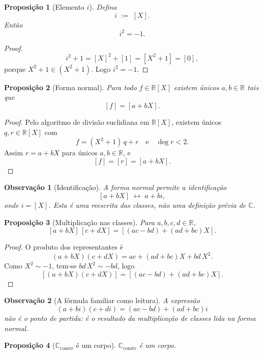 \documentclass[11pt,a4paper]{article}
\newtheorem{proposicao}{Proposição}
\newtheorem{observacao}{Observação}
\begin{document}
\begin{proposicao}[Elemento \(i\)]
\label{prop:i}
Defina
\[
i
\;:=\;
[X].
\]
Então
\[
i^2
=
-1.
\]
\end{proposicao}

\begin{proof}
\[
i^2+1
=
[X]^2+[1]
=
[X^2+1]
=
[0],
\]
porque \(X^2+1\in(X^2+1)\). Logo \(i^2=-1\).
\end{proof}

\begin{proposicao}[Forma normal]
\label{prop:forma-normal}
Para todo \(f\in\mathbb R[X]\) existem únicos \(a,b\in\mathbb R\) tais que
\[
[f]
=
[a+bX].
\]
\end{proposicao}

\begin{proof}
Pelo algoritmo de divisão euclidiana em \(\mathbb R[X]\), existem únicos \(q,r\in\mathbb R[X]\) com
\[
f
=
(X^2+1)\,q
+
r
\quad\text{e}\quad
\deg r<2.
\]
Assim \(r=a+bX\) para únicos \(a,b\in\mathbb R\), e
\[
[f]
=
[r]
=
[a+bX].
\]
\end{proof}

\begin{observacao}[Identificação]
\label{obs:identificacao-C}
A forma normal permite a identificação
\[
[a+bX]
\;\longleftrightarrow\;
a+bi,
\]
onde \(i=[X]\). Esta é uma reescrita das classes, não uma definição prévia de \(\mathbb C\).
\end{observacao}

\begin{proposicao}[Multiplicação nas classes]
\label{prop:mult-classes}
Para \(a,b,c,d\in\mathbb R\),
\[
[a+bX]\,[c+dX]
=
[(ac-bd)+(ad+bc)X].
\]
\end{proposicao}

\begin{proof}
O produto dos representantes é
\[
(a+bX)(c+dX)
=
ac+(ad+bc)X+bd\,X^2.
\]
Como \(X^2\sim -1\), tem-se \(bd\,X^2\sim -bd\), logo
\[
[(a+bX)(c+dX)]
=
[(ac-bd)+(ad+bc)X].
\]
\end{proof}

\begin{observacao}[A fórmula familiar como leitura]
\label{obs:formula-leitura}
A expressão
\[
(a+bi)(c+di)
=
(ac-bd)+(ad+bc)i
\]
não é o ponto de partida: é o resultado da multiplicação de classes lida na forma normal.
\end{observacao}

\begin{proposicao}[\(\mathbb C_{\mathrm{constr}}\) é um corpo]
\label{prop:C-corpo}
\(\mathbb C_{\mathrm{constr}}\) é um corpo.
\end{proposicao}
\end{document}
